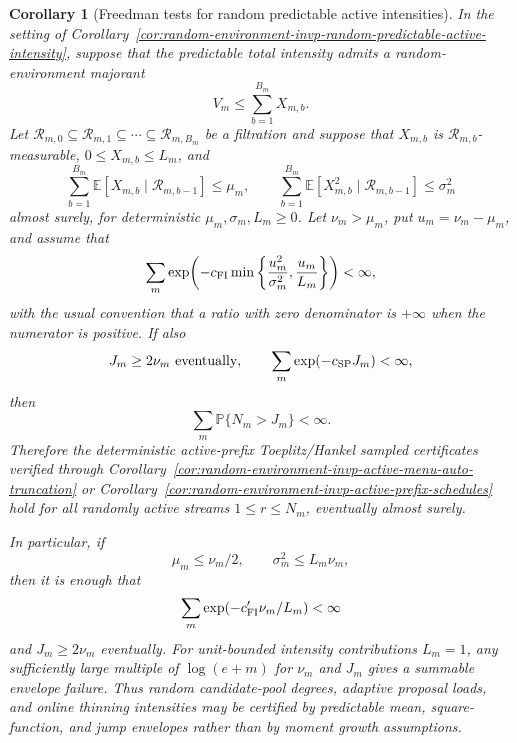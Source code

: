 \documentclass[11pt]{amsart}
\numberwithin{equation}{section}
\newtheorem{corollary}[theorem]{Corollary}
\theoremstyle{definition}
\theoremstyle{remark}
\newcommand{\Prob}{\mathbb P}
\newcommand{\Exp}{\mathbb E}
\begin{document}
\begin{corollary}[Freedman tests for random predictable active intensities]
\label{cor:random-environment-invp-freedman-predictable-active-intensity}
In the setting of
Corollary~\ref{cor:random-environment-invp-random-predictable-active-intensity},
suppose that the predictable total intensity admits a random-environment
majorant
\[
  V_m\le\sum_{b=1}^{B_m}X_{m,b}.
\]
Let
\(\mathcal R_{m,0}\subseteq\mathcal R_{m,1}\subseteq\cdots\subseteq
\mathcal R_{m,B_m}\) be a filtration and suppose that
\(X_{m,b}\) is \(\mathcal R_{m,b}\)-measurable, \(0\le X_{m,b}\le L_m\), and
\[
  \sum_{b=1}^{B_m}
  \Exp[X_{m,b}\mid\mathcal R_{m,b-1}]\le\mu_m,
  \qquad
  \sum_{b=1}^{B_m}
  \Exp[X_{m,b}^2\mid\mathcal R_{m,b-1}]\le\sigma_m^2
\]
almost surely, for deterministic \(\mu_m,\sigma_m,L_m\ge0\).  Let
\(\nu_m>\mu_m\), put \(u_m=\nu_m-\mu_m\), and assume that
\[
  \sum_m
  \exp\!\left(
    -c_{\rm FI}\min\left\{\frac{u_m^2}{\sigma_m^2},
                          \frac{u_m}{L_m}\right\}
  \right)<\infty,
\]
with the usual convention that a ratio with zero denominator is \(+\infty\)
when the numerator is positive.  If also
\[
  J_m\ge2\nu_m\ \text{eventually},
  \qquad
  \sum_m\exp(-c_{\rm SP}J_m)<\infty,
\]
then
\[
  \sum_m\Prob\{N_m>J_m\}<\infty .
\]
Therefore the deterministic active-prefix Toeplitz/Hankel sampled certificates
verified through
Corollary~\ref{cor:random-environment-invp-active-menu-auto-truncation} or
Corollary~\ref{cor:random-environment-invp-active-prefix-schedules} hold for
all randomly active streams \(1\le r\le N_m\), eventually almost surely.

In particular, if
\[
  \mu_m\le\nu_m/2,\qquad
  \sigma_m^2\le L_m\nu_m,
\]
then it is enough that
\[
  \sum_m \exp(-c'_{\rm FI}\nu_m/L_m)<\infty
\]
and \(J_m\ge2\nu_m\) eventually.  For unit-bounded intensity contributions
\(L_m=1\), any sufficiently large multiple of \(\log(e+m)\) for \(\nu_m\) and
\(J_m\) gives a summable envelope failure.  Thus random candidate-pool degrees,
adaptive proposal loads, and online thinning intensities may be certified by
predictable mean, square-function, and jump envelopes rather than by moment
growth assumptions.
\end{corollary}
\end{document}
